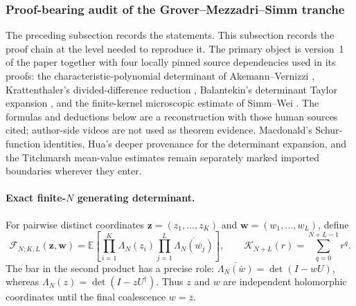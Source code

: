\subsubsection{Proof-bearing audit of the Grover--Mezzadri--Simm tranche}
\label{sec:GMS-complete-proof-audit}

The preceding subsection records the statements.  This subsection records the proof chain at
the level needed to reproduce it.  The primary object is version~1 of the paper together with
four locally pinned source dependencies used in its proofs: the characteristic-polynomial determinant of
Akemann--Vernizzi
\cite[Thm.~1 and its proof]{akemannVernizzi2003}, Krattenthaler's divided-difference reduction
\cite[Lemma~22]{krattenthaler1999}, Balantekin's determinant Taylor expansion
\cite[App.~B]{balantekin2000}, and the finite-kernel microscopic estimate of Simm--Wei
\cite[Sec.~5.1]{simmWei2026}.  The formulas and deductions below are a reconstruction with
those human sources cited; author-side videos are not used as theorem evidence.  Macdonald's
Schur-function identities, Hua's deeper provenance for the determinant expansion, and the
Titchmarsh mean-value estimates remain separately marked imported boundaries wherever they
enter.

\paragraph{Exact finite-$N$ generating determinant.}
For pairwise distinct coordinates
$\mathbf z=(z_1,\ldots,z_K)$ and $\mathbf w=(w_1,\ldots,w_L)$, define
\begin{equation}
 \mathcal F_{N;K,L}(\mathbf z,\mathbf w)
 =\mathbb E\!\left[
   \prod_{i=1}^{K}\Lambda_N(z_i)
   \prod_{j=1}^{L}\overline{\Lambda_N(\overline{w_j})}
 \right],
 \qquad
 \mathcal K_{N+L}(r)=\sum_{q=0}^{N+L-1}r^q.
 \label{eq:GMS-audit-F}
\end{equation}
The bar in the second product has a precise role:
$\overline{\Lambda_N(\overline w)}=\det(I-wU)$, whereas
$\Lambda_N(z)=\det(I-zU^\dagger)$.  Thus $z$ and $w$ are independent holomorphic
coordinates until the final coalescence $w=\overline z$.

